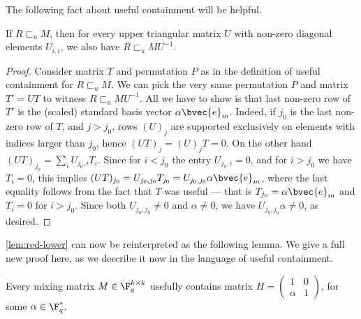 \documentclass[11pt]{article}
\newcommand{\usef}{\sqsubset_u}
\newcommand{\HadMat}{\left(\begin{smallmatrix} 1 & 0 \\ \alpha & 1 \end{smallmatrix}\right)}
\begin{document}
The following fact about useful containment will be helpful.
\begin{proposition}
	If $R \usef M$, then for every upper triangular matrix $U$ with non-zero diagonal elements $U_{i,i}$, we also have $R \usef MU^{-1}$. 
	\label{claim:useful-upper}
\end{proposition}
\begin{proof}
	Consider matrix $T$ and permutation $P$ as in the definition of useful containment for $R \usef M$. We can pick the very same permutation $P$ and matrix $T' = UT$ to witness $R \usef MU^{-1}$. All we have to show is that last non-zero row of $T'$ is the (scaled) standard basis vector $\alpha\bvec{e}_m$. Indeed, if $j_0$ is the last non-zero row of $T$, and $j > j_0$, rows $(U)_{j}$ are supported exclusively on elements with indices larger than $j_0$, hence $(UT)_{j} = (U)_j T = 0$. On the other hand $(U T)_{j_0} = \sum_{i} U_{j_0, i} T_i$. Since for $i < j_0$ the entry $U_{j_0, i} = 0$, and for $i > j_0$ we have $T_i=0$, this implies $(U T)_{j_0} = U_{j_0, j_0} T_{j_0} = U_{j_0, j_0} \alpha \bvec{e}_m$, where the last equality follows from the fact that $T$ was useful --- that is $T_{j_0} = \alpha \bvec{e}_m$ and $T_i = 0$ for $i > j_0$. Since both $U_{j_0, j_0}\ne 0$ and $\alpha\ne 0$, we have $U_{j_0, j_0} \alpha\neq 0$, as desired.
\end{proof}

\cref{lem:red-lower} can now be reinterpreted as the following lemma. We give a full new proof here, as we describe it now in the language of useful containment. 

\begin{lemma}\label{lem:everyMcontainsH}
	Every mixing matrix $M \in \F_q^{k\times k}$ usefully contains matrix $H = \HadMat$, for some $\alpha\in\F_q^*$.
\end{lemma}
\end{document}
